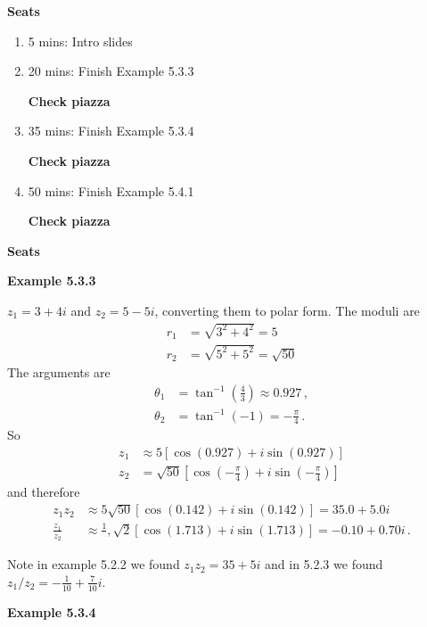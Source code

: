 \textbf{Seats}
\begin{enumerate}
    \item 5 mins: Intro slides \par
    \item 20 mins: Finish Example 5.3.3 \par
    \textbf{Check piazza}
    \item 35 mins: Finish Example 5.3.4 \par
    \textbf{Check piazza}
    \item 50 mins: Finish Example 5.4.1 \par
    \textbf{Check piazza}
\end{enumerate}
\textbf{Seats}

\newcommand{\vect}[1]{\underline{\mathbf{#1}}}

\vspace{5mm} 

\textbf{Example 5.3.3} \par

$z_1 = 3+4i$ and $z_2 = 5-5i$, converting them to polar form. The moduli are
\begin{align*}
r_1 &= \sqrt{3^2+4^2}=5 \\
r_2 &= \sqrt{5^2+5^2}=\sqrt{50}
\end{align*}
The arguments are
\begin{align*}
\theta_1 &= \tan^{-1}\left(\frac{4}{3}\right) \approx
0.927 \, ,\\
\theta_2 &= \tan^{-1}\left(-1\right) = -\frac{\pi}{4} \, .
\end{align*}
So
\begin{align*}
    z_1 &\approx 5\left[\cos\left(0.927\right) + i \sin \left(0.927\right)\right] \\
    z_2 &= \sqrt{50}\left[\cos\left(-\frac{\pi}{4}\right) + i \sin \left(-\frac{\pi}{4}\right)\right]
\end{align*}
and therefore
\begin{align*}
    z_1 z_2 &\approx 5 \sqrt{50} \left[\cos\left(0.142\right) + i \sin \left(0.142\right)\right] = 35.0 + 5.0 i \\
    \frac{z_1}{z_2} &\approx \frac{1} \, ,{\sqrt{2}}\left[\cos\left(1.713\right) + i \sin \left(1.713\right)\right] = -0.10 + 0.70 i \, .
\end{align*}

Note in example 5.2.2 we found $z_1 z_2 = 35 + 5i$ and in 5.2.3 we found $z_1/z_2 = -\frac{1}{10} + \frac{7}{10}i$.

\newpage
\textbf{Example 5.3.4} \par

